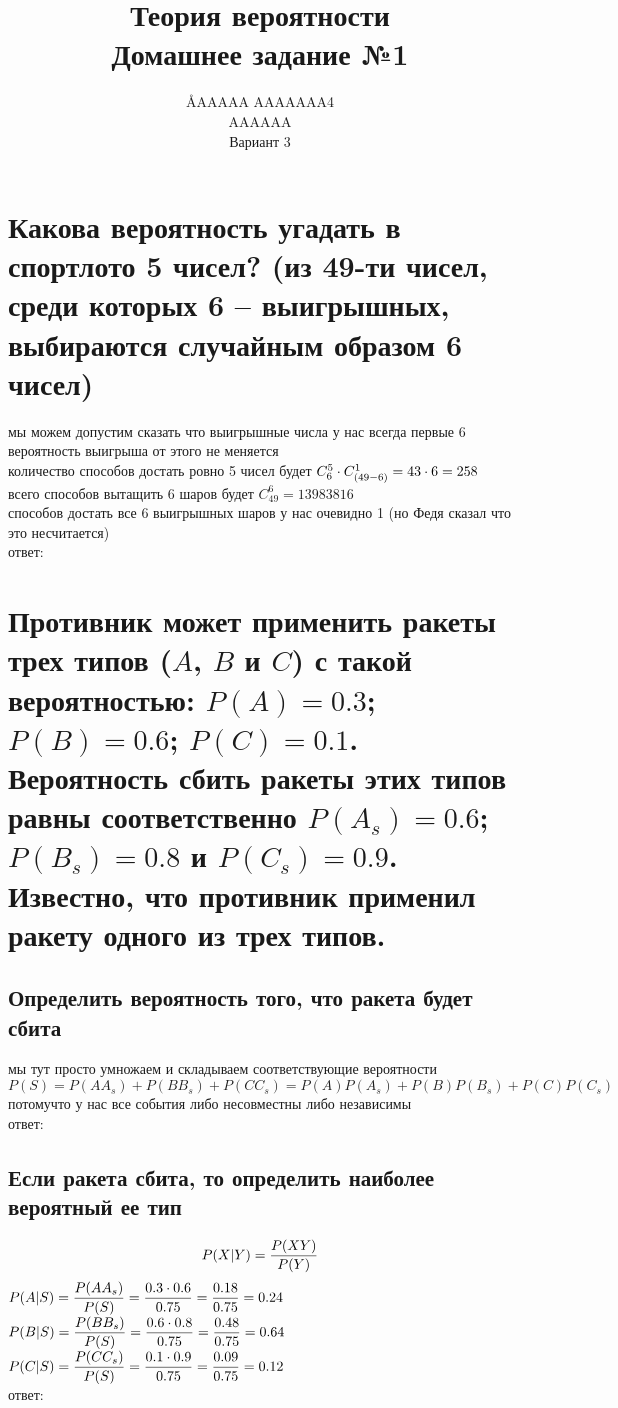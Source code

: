 \documentclass{article}
\title{Теория вероятности \\ Домашнее задание №1}
\author{\AA{AAAAA AAAAAAA}{4} \\ AAAAAA \\ Вариант 3}
\begin{document}
  \maketitle

  \section{Какова вероятность угадать в спортлото 5 чисел? (из 49-ти чисел, среди которых 6 -- выигрышных, выбираются случайным образом 6 чисел)}
  мы можем допустим сказать что выигрышные числа у нас всегда первые 6 \\
  вероятность выигрыша от этого не меняется \\
  количество способов достать ровно 5 чисел будет $C^5_6 \cdot C^1_{\left(49-6\right)} = 43 \cdot 6 = 258$ \\
  всего способов вытащить 6 шаров будет $C^6_{49} = 13983816$ \\
  способов достать все 6 выигрышных шаров у нас очевидно 1 (но Федя сказал что это несчитается) \\
  ответ: 


  \section{Противник может применить ракеты трех типов ($A$, $B$ и $C$) с такой вероятностью: $P(A) = 0.3$; $P(B) = 0.6$; $P(C) = 0.1$. Вероятность сбить ракеты этих типов равны соответственно $P(A_s) = 0.6$; $P(B_s) = 0.8$ и $P(C_s) = 0.9$. Известно, что противник применил ракету одного из трех типов.}

  \subsection{Определить вероятность того, что ракета будет сбита}
  мы тут просто умножаем и складываем соответствующие вероятности \\
  $P(S) = P(AA_s) + P(BB_s) + P(CC_s) = P(A)P(A_s) + P(B)P(B_s) + P(C)P(C_s)$ \\
  потомучто у нас все события либо несовместны либо независимы \\
  ответ: 

  \subsection{Если ракета сбита, то определить наиболее вероятный ее тип}
  $$ P(X|Y) = \frac{P(XY)}{P(Y)} $$
  $\displaystyle P(A|S) = \frac{P(AA_s)}{P(S)} = \frac{0.3 \cdot 0.6}{0.75} = \frac{0.18}{0.75} = 0.24$ \\
  $\displaystyle P(B|S) = \frac{P(BB_s)}{P(S)} = \frac{0.6 \cdot 0.8}{0.75} = \frac{0.48}{0.75} = 0.64$ \\
  $\displaystyle P(C|S) = \frac{P(CC_s)}{P(S)} = \frac{0.1 \cdot 0.9}{0.75} = \frac{0.09}{0.75} = 0.12$ \\
  ответ: 
\end{document}
